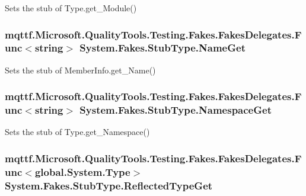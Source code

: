 Sets the stub of Type.\-get\-\_\-\-Module()

\hypertarget{class_system_1_1_fakes_1_1_stub_type_a78b3c148e89d96c8716d4270aa965a0b}{
\subsubsection[{Name\-Get}]{\setlength{\rightskip}{0pt plus 5cm}mqttf.\-Microsoft.\-Quality\-Tools.\-Testing.\-Fakes.\-Fakes\-Delegates.\-Func$<$string$>$ System.\-Fakes.\-Stub\-Type.\-Name\-Get}}\label{class_system_1_1_fakes_1_1_stub_type_a78b3c148e89d96c8716d4270aa965a0b}


Sets the stub of Member\-Info.\-get\-\_\-\-Name()

\hypertarget{class_system_1_1_fakes_1_1_stub_type_a0a4456bd90a6c89c8b3c7ec8d9a46ede}{
\subsubsection[{Namespace\-Get}]{\setlength{\rightskip}{0pt plus 5cm}mqttf.\-Microsoft.\-Quality\-Tools.\-Testing.\-Fakes.\-Fakes\-Delegates.\-Func$<$string$>$ System.\-Fakes.\-Stub\-Type.\-Namespace\-Get}}\label{class_system_1_1_fakes_1_1_stub_type_a0a4456bd90a6c89c8b3c7ec8d9a46ede}


Sets the stub of Type.\-get\-\_\-\-Namespace()

\hypertarget{class_system_1_1_fakes_1_1_stub_type_a6550b274561c9d564a7e937f7bc187ed}{
\subsubsection[{Reflected\-Type\-Get}]{\setlength{\rightskip}{0pt plus 5cm}mqttf.\-Microsoft.\-Quality\-Tools.\-Testing.\-Fakes.\-Fakes\-Delegates.\-Func$<$global.\-System.\-Type$>$ System.\-Fakes.\-Stub\-Type.\-Reflected\-Type\-Get}}\label{class_system_1_1_fakes_1_1_stub_type_a6550b274561c9d564a7e937f7bc187ed}


